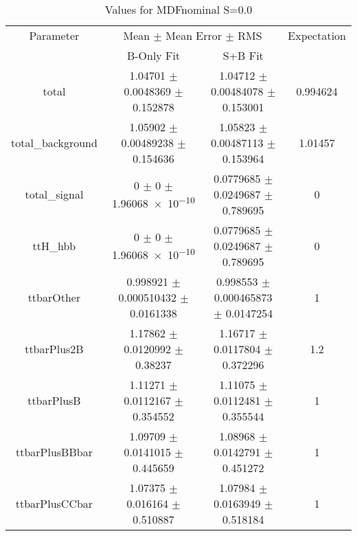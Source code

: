 \begin{table}
\centering
\caption{Values for MDFnominal S=0.0}
\begin{tabular}{cccc}
\toprule
Parameter & \multicolumn{2}{c}{Mean $\pm$ Mean Error $\pm$ RMS} & Expectation\\
 & B-Only Fit & S+B Fit & \\
\midrule
total & \num{1.04701} $\pm$ \num{0.0048369} $\pm$ \num{0.152878} & \num{1.04712} $\pm$ \num{0.00484078} $\pm$ \num{0.153001} & \num{0.994624}\\
total\_background & \num{1.05902} $\pm$ \num{0.00489238} $\pm$ \num{0.154636} & \num{1.05823} $\pm$ \num{0.00487113} $\pm$ \num{0.153964} & \num{1.01457}\\
total\_signal & \num{0} $\pm$ \num{0} $\pm$ \num{1.96068e-10} & \num{0.0779685} $\pm$ \num{0.0249687} $\pm$ \num{0.789695} & \num{0}\\
ttH\_hbb & \num{0} $\pm$ \num{0} $\pm$ \num{1.96068e-10} & \num{0.0779685} $\pm$ \num{0.0249687} $\pm$ \num{0.789695} & \num{0}\\
ttbarOther & \num{0.998921} $\pm$ \num{0.000510432} $\pm$ \num{0.0161338} & \num{0.998553} $\pm$ \num{0.000465873} $\pm$ \num{0.0147254} & \num{1}\\
ttbarPlus2B & \num{1.17862} $\pm$ \num{0.0120992} $\pm$ \num{0.38237} & \num{1.16717} $\pm$ \num{0.0117804} $\pm$ \num{0.372296} & \num{1.2}\\
ttbarPlusB & \num{1.11271} $\pm$ \num{0.0112167} $\pm$ \num{0.354552} & \num{1.11075} $\pm$ \num{0.0112481} $\pm$ \num{0.355544} & \num{1}\\
ttbarPlusBBbar & \num{1.09709} $\pm$ \num{0.0141015} $\pm$ \num{0.445659} & \num{1.08968} $\pm$ \num{0.0142791} $\pm$ \num{0.451272} & \num{1}\\
ttbarPlusCCbar & \num{1.07375} $\pm$ \num{0.016164} $\pm$ \num{0.510887} & \num{1.07984} $\pm$ \num{0.0163949} $\pm$ \num{0.518184} & \num{1}\\
\bottomrule
\end{tabular}
\end{table}